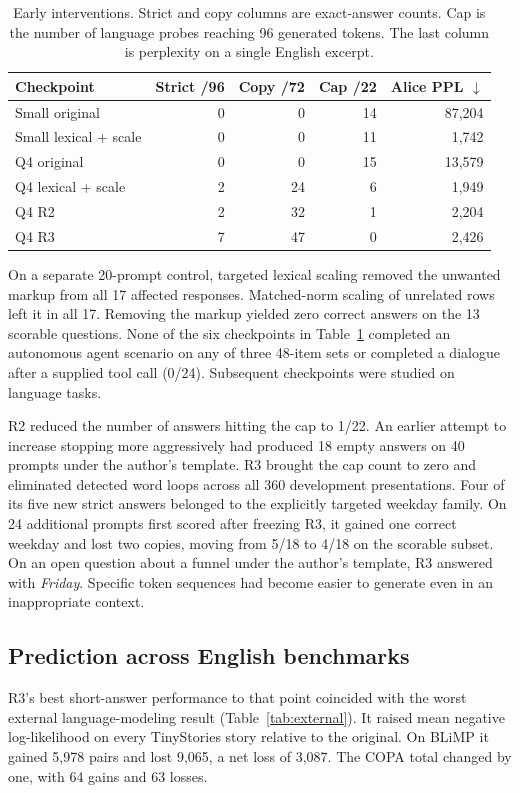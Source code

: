 \documentclass[11pt]{article}
\begin{document}
\begin{table}[tbp]\centering\small
\caption{Early interventions. Strict and copy columns are exact-answer counts. Cap is the number of language probes reaching 96 generated tokens. The last column is perplexity on a single English excerpt.}\label{tab:local}
\begin{tabular}{@{}lrrrr@{}}\toprule
Checkpoint & Strict /96 & Copy /72 & Cap /22 & Alice PPL $\downarrow$\\\midrule
Small original & 0 & 0 & 14 & 87,204\\
Small lexical + scale & 0 & 0 & 11 & 1,742\\
Q4 original & 0 & 0 & 15 & 13,579\\
Q4 lexical + scale & 2 & 24 & 6 & 1,949\\
Q4 R2 & 2 & 32 & 1 & 2,204\\
Q4 R3 & 7 & 47 & 0 & 2,426\\\bottomrule
\end{tabular}
\end{table}

On a separate 20-prompt control, targeted lexical scaling removed the unwanted markup from all 17 affected responses. Matched-norm scaling of unrelated rows left it in all 17. Removing the markup yielded zero correct answers on the 13 scorable questions. None of the six checkpoints in Table~\ref{tab:local} completed an autonomous agent scenario on any of three 48-item sets or completed a dialogue after a supplied tool call (0/24). Subsequent checkpoints were studied on language tasks.

R2 reduced the number of answers hitting the cap to 1/22. An earlier attempt to increase stopping more aggressively had produced 18 empty answers on 40 prompts under the author's template. R3 brought the cap count to zero and eliminated detected word loops across all 360 development presentations. Four of its five new strict answers belonged to the explicitly targeted weekday family. On 24 additional prompts first scored after freezing R3, it gained one correct weekday and lost two copies, moving from 5/18 to 4/18 on the scorable subset. On an open question about a funnel under the author's template, R3 answered with \emph{Friday}. Specific token sequences had become easier to generate even in an inappropriate context.

\subsection{Prediction across English benchmarks}
R3's best short-answer performance to that point coincided with the worst external language-modeling result (Table~\ref{tab:external}). It raised mean negative log-likelihood on every TinyStories story relative to the original. On BLiMP it gained 5,978 pairs and lost 9,065, a net loss of 3,087. The COPA total changed by one, with 64 gains and 63 losses.
\end{document}
